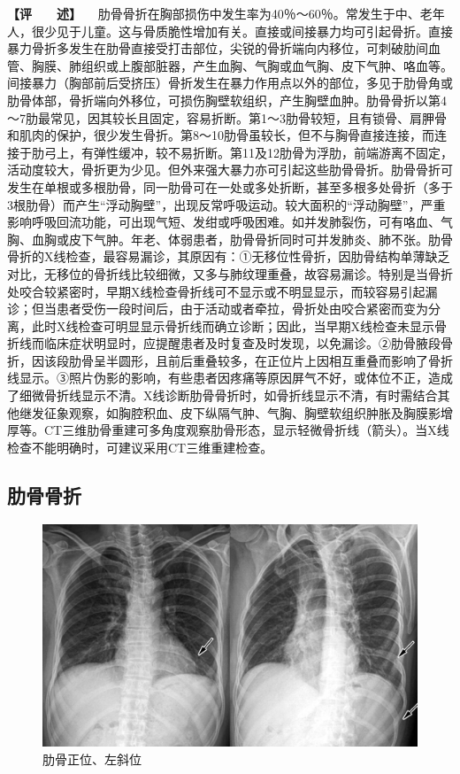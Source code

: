 \textbf{【评　　述】}
　肋骨骨折在胸部损伤中发生率为40％～60％。常发生于中、老年人，很少见于儿童。这与骨质脆性增加有关。直接或间接暴力均可引起骨折。直接暴力骨折多发生在肋骨直接受打击部位，尖锐的骨折端向内移位，可刺破肋间血管、胸膜、肺组织或上腹部脏器，产生血胸、气胸或血气胸、皮下气肿、咯血等。间接暴力（胸部前后受挤压）骨折发生在暴力作用点以外的部位，多见于肋骨角或肋骨体部，骨折端向外移位，可损伤胸壁软组织，产生胸壁血肿。肋骨骨折以第4～7肋最常见，因其较长且固定，容易折断。第1～3肋骨较短，且有锁骨、肩胛骨和肌肉的保护，很少发生骨折。第8～10肋骨虽较长，但不与胸骨直接连接，而连接于肋弓上，有弹性缓冲，较不易折断。第11及12肋骨为浮肋，前端游离不固定，活动度较大，骨折更为少见。但外来强大暴力亦可引起这些肋骨骨折。肋骨骨折可发生在单根或多根肋骨，同一肋骨可在一处或多处折断，甚至多根多处骨折（多于3根肋骨）而产生“浮动胸壁”，出现反常呼吸运动。较大面积的“浮动胸壁”，严重影响呼吸回流功能，可出现气短、发绀或呼吸困难。如并发肺裂伤，可有咯血、气胸、血胸或皮下气肿。年老、体弱患者，肋骨骨折同时可并发肺炎、肺不张。肋骨骨折的X线检查，最容易漏诊，其原因有：①无移位性骨折，因肋骨结构单薄缺乏对比，无移位的骨折线比较细微，又多与肺纹理重叠，故容易漏诊。特别是当骨折处咬合较紧密时，早期X线检查骨折线可不显示或不明显显示，而较容易引起漏诊；但当患者受伤一段时间后，由于活动或者牵拉，骨折处由咬合紧密而变为分离，此时X线检查可明显显示骨折线而确立诊断；因此，当早期X线检查未显示骨折线而临床症状明显时，应提醒患者及时复查及时发现，以免漏诊。②肋骨腋段骨折，因该段肋骨呈半圆形，且前后重叠较多，在正位片上因相互重叠而影响了骨折线显示。③照片伪影的影响，有些患者因疼痛等原因屏气不好，或体位不正，造成了细微骨折线显示不清。X线诊断肋骨骨折时，如骨折线显示不清，有时需结合其他继发征象观察，如胸腔积血、皮下纵隔气肿、气胸、胸壁软组织肿胀及胸膜影增厚等。CT三维肋骨重建可多角度观察肋骨形态，显示轻微骨折线（箭头）。当X线检查不能明确时，可建议采用CT三维重建检查。

\subsection{肋骨骨折}

\begin{figure}[!htbp]
 \centering
 \includegraphics{./images/Image00042.jpg}
 \captionsetup{justification=centering}
 \caption{肋骨正位、左斜位}
 \label{fig2-3-15}
  \end{figure} 

